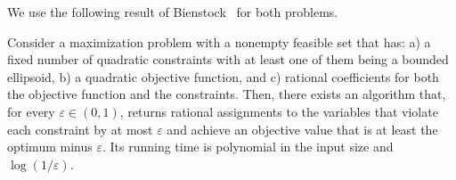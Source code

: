 We use the following result of Bienstock~\citep[Theorem~1.3]{bienstock2016cdt} for both problems.

\begin{theorem}
  \label{thm:bienstock}
Consider a maximization problem with a nonempty feasible set that has: a) a fixed number of quadratic constraints with at least one of them being a bounded ellipsoid, b) a quadratic objective function, and c) rational coefficients for both the objective function and the constraints. Then, there exists an algorithm that, for every
$\varepsilon\in(0,1)$, returns rational assignments to the variables that violate
each constraint by at most $\varepsilon$ and achieve an objective value that is at
least the optimum minus $\varepsilon$. Its running time is polynomial in
the input size and $\log(1/\varepsilon)$.
\end{theorem}

